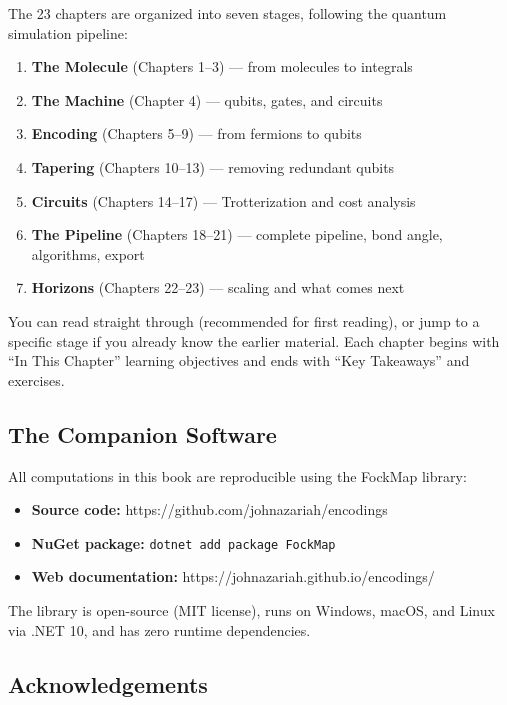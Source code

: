 \documentclass[
  11pt,
  oneside]{book}
\providecommand{\tightlist}{%
  \setlength{\itemsep}{0pt}\setlength{\parskip}{0pt}}
\begin{document}
The 23 chapters are organized into seven stages, following the quantum
simulation pipeline:

\begin{enumerate}
\def\labelenumi{\arabic{enumi}.}
\tightlist
\item
  \textbf{The Molecule} (Chapters 1--3) --- from molecules to integrals
\item
  \textbf{The Machine} (Chapter 4) --- qubits, gates, and circuits
\item
  \textbf{Encoding} (Chapters 5--9) --- from fermions to qubits
\item
  \textbf{Tapering} (Chapters 10--13) --- removing redundant qubits
\item
  \textbf{Circuits} (Chapters 14--17) --- Trotterization and cost
  analysis
\item
  \textbf{The Pipeline} (Chapters 18--21) --- complete pipeline, bond
  angle, algorithms, export
\item
  \textbf{Horizons} (Chapters 22--23) --- scaling and what comes next
\end{enumerate}

You can read straight through (recommended for first reading), or jump
to a specific stage if you already know the earlier material. Each
chapter begins with ``In This Chapter'' learning objectives and ends
with ``Key Takeaways'' and exercises.

\subsection{The Companion Software}\label{the-companion-software}

All computations in this book are reproducible using the FockMap
library:

\begin{itemize}
\tightlist
\item
  \textbf{Source code:} https://github.com/johnazariah/encodings
\item
  \textbf{NuGet package:} \texttt{dotnet\ add\ package\ FockMap}
\item
  \textbf{Web documentation:} https://johnazariah.github.io/encodings/
\end{itemize}

The library is open-source (MIT license), runs on Windows, macOS, and
Linux via .NET 10, and has zero runtime dependencies.

\subsection{Acknowledgements}\label{acknowledgements}
\end{document}
